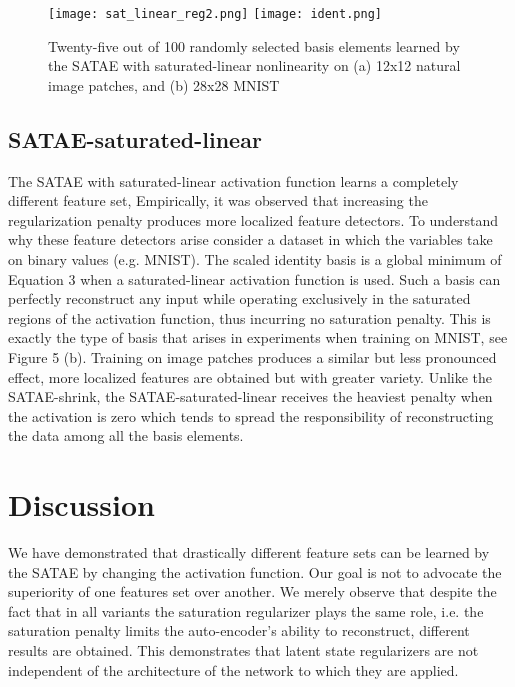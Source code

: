 \documentclass{article} %
\begin{document}
\begin{figure}
\centering 
\texttt{[image: sat\_linear\_reg2.png]}
\texttt{[image: ident.png]}
\caption{Twenty-five out of 100 randomly selected basis elements learned by the SATAE with saturated-linear nonlinearity on (a) 12x12 natural image patches, and (b) 28x28 MNIST }
\end{figure} 

\subsection{SATAE-saturated-linear} 
The SATAE with saturated-linear activation function learns a completely different feature set, Empirically, it was observed that increasing the regularization penalty produces more localized feature detectors. To understand why these feature detectors arise consider a dataset in which the variables take on binary values (e.g. MNIST). The scaled identity basis is a global minimum of Equation 3 when a saturated-linear activation function is used. Such a basis can perfectly reconstruct any input while operating exclusively in the saturated regions of the activation function, thus incurring no saturation penalty. This is exactly the type of basis that arises in experiments when training on MNIST, see Figure 5 (b). Training on image patches produces a similar but less pronounced effect, more localized features are obtained but with greater variety. Unlike the SATAE-shrink, the SATAE-saturated-linear receives the heaviest penalty when the activation is zero which tends to spread the responsibility of reconstructing the data among all the basis elements.   

\section{Discussion}
We have demonstrated that drastically different feature sets can be learned by the SATAE by changing the activation function. Our goal is not to advocate the superiority of one features set over another. We merely observe that despite the fact that in all variants the saturation regularizer plays the same role, i.e. the saturation penalty limits the auto-encoder's ability to reconstruct, different results are obtained. This demonstrates that latent state regularizers are not independent of the architecture of the network to which they are applied.   
\end{document}
